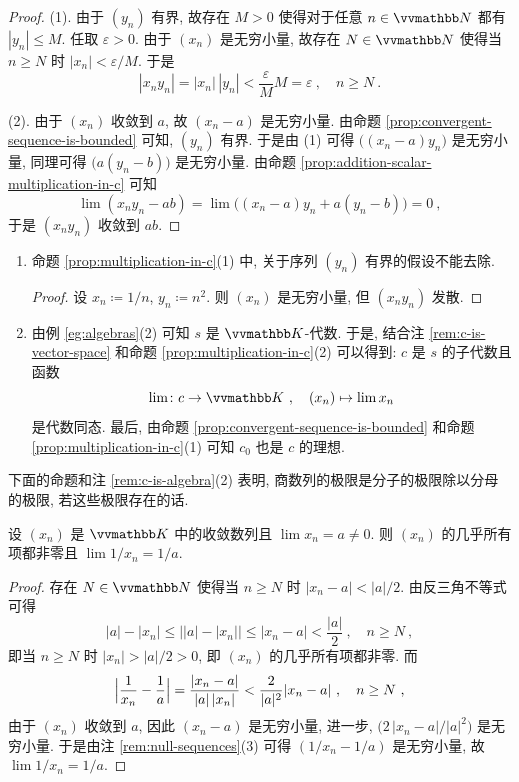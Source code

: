 \begin{proof}
    (1). 由于 \((y_n)\) 有界, 故存在 \(M > 0\) 使得对于任意 \(n \in \N\) 都有 \(|y_n| \leq M\). 任取 \(\varepsilon > 0\). 由于 \((x_n)\) 是无穷小量, 故存在 \(N \in \N\) 使得当 \(n \geq N\) 时 \(|x_n| < \varepsilon / M\). 于是
    \[
        |x_n y_n| = |x_n|\, |y_n| < \frac{\varepsilon}{M} M = \varepsilon\ ,\quad n \geq N\ .
    \]

    (2). 由于 \((x_n)\) 收敛到 \(a\), 故 \((x_n - a)\) 是无穷小量. 由命题 \ref{prop:convergent-sequence-is-bounded} 可知, \((y_n)\) 有界. 于是由 (1) 可得 \(\bigl((x_n - a) y_n\bigr)\) 是无穷小量, 同理可得 \(\bigl(a (y_n - b)\bigr)\) 是无穷小量. 由命题 \ref{prop:addition-scalar-multiplication-in-c} 可知
    \[
        \lim(x_n y_n - a b) = \lim\bigl((x_n - a) y_n + a (y_n - b)\bigr) = 0\ ,
    \]
    于是 \((x_n y_n)\) 收敛到 \(a b\).
\end{proof}

\begin{remark}\label{rem:c-is-algebra}
    \begin{enumerate}
        \item 命题 \ref{prop:multiplication-in-c}(1) 中, 关于序列 \((y_n)\) 有界的假设不能去除.
        \begin{proof}
            设 \(x_n \coloneqq 1 / n\), \(y_n \coloneqq n^2\). 则 \((x_n)\) 是无穷小量, 但 \((x_n y_n)\) 发散.
        \end{proof}
        \item 由例 \ref{eg:algebras}(2) 可知 \(s\) 是 \(\K\)-代数. 于是, 结合注 \ref{rem:c-is-vector-space} 和命题 \ref{prop:multiplication-in-c}(2) 可以得到: \(c\) 是 \(s\) 的子代数且函数
        \[
            \lim \colon c \to \K\ ,\quad (x_n) \mapsto \lim x_n
        \]
        是代数同态. 最后, 由命题 \ref{prop:convergent-sequence-is-bounded} 和命题 \ref{prop:multiplication-in-c}(1) 可知 \(c_0\) 也是 \(c\) 的理想.
    \end{enumerate}
\end{remark}

下面的命题和注 \ref{rem:c-is-algebra}(2) 表明, 商数列的极限是分子的极限除以分母的极限, 若这些极限存在的话.

\begin{proposition}\label{prop:division-in-c}
    设 \((x_n)\) 是 \(\K\) 中的收敛数列且 \(\lim x_n = a \neq 0\). 则 \((x_n)\) 的几乎所有项都非零且 \(\lim 1 / x_n = 1 / a\).
\end{proposition}

\begin{proof}
    存在 \(N \in \N\) 使得当 \(n \geq N\) 时 \(|x_n - a| < |a| \big/ 2\). 由反三角不等式可得
    \[
        |a| - |x_n| \leq \bigl||a| - |x_n|\bigr| \leq |x_n - a| < \frac{|a|}{2}\ ,\quad n \geq N\ ,
    \]
    即当 \(n \geq N\) 时 \(|x_n| > |a| \big/ 2 > 0\), 即 \((x_n)\) 的几乎所有项都非零. 而
    \[
        \Bigl|\frac{1}{x_n} - \frac{1}{a}\Bigr| = \frac{|x_n - a|}{|a|\, |x_n|} < \frac{2}{|a|^2} |x_n - a|\ ,\quad n \geq N\ ,
    \]
    由于 \((x_n)\) 收敛到 \(a\), 因此 \((x_n - a)\) 是无穷小量, 进一步, \(\bigl(2\, |x_n - a| \big/ |a|^2\bigr)\) 是无穷小量. 于是由注 \ref{rem:null-sequences}(3) 可得 \((1 / x_n - 1 / a)\) 是无穷小量, 故 \(\lim 1 / x_n = 1 / a\).
\end{proof}

